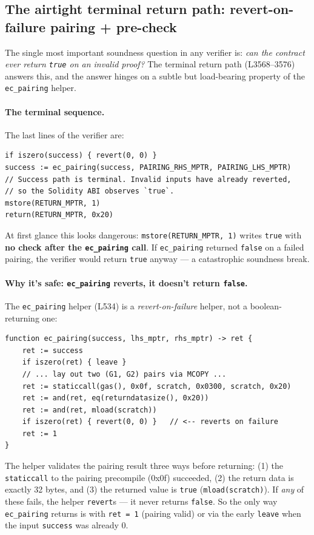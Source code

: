 \subsection{The airtight terminal return path: revert-on-failure pairing + pre-check}
\label{sec:pr-returnpath}

The single most important soundness question in any verifier is:
\emph{can the contract ever return \texttt{true} on an invalid
proof?} The terminal return path (L3568--3576) answers this, and
the answer hinges on a subtle but load-bearing property of the
\texttt{ec\_pairing} helper.

\paragraph{The terminal sequence.} The last lines of the verifier
are:
\begin{lstlisting}[style=yul]
if iszero(success) { revert(0, 0) }
success := ec_pairing(success, PAIRING_RHS_MPTR, PAIRING_LHS_MPTR)
// Success path is terminal. Invalid inputs have already reverted,
// so the Solidity ABI observes `true`.
mstore(RETURN_MPTR, 1)
return(RETURN_MPTR, 0x20)
\end{lstlisting}
At first glance this looks dangerous: \texttt{mstore(RETURN\_\allowbreak{}MPTR,
1)} writes \texttt{true} with \textbf{no check after the
\texttt{ec\_pairing} call}. If \texttt{ec\_pairing} returned
\texttt{false} on a failed pairing, the verifier would return
\texttt{true} anyway --- a catastrophic soundness break.

\paragraph{Why it's safe: \texttt{ec\_pairing} reverts, it doesn't
return \texttt{false}.} The \texttt{ec\_pairing} helper (L534) is
a \emph{revert-on-failure} helper, not a boolean-returning one:
\begin{lstlisting}[style=yul]
function ec_pairing(success, lhs_mptr, rhs_mptr) -> ret {
    ret := success
    if iszero(ret) { leave }
    // ... lay out two (G1, G2) pairs via MCOPY ...
    ret := staticcall(gas(), 0x0f, scratch, 0x0300, scratch, 0x20)
    ret := and(ret, eq(returndatasize(), 0x20))
    ret := and(ret, mload(scratch))
    if iszero(ret) { revert(0, 0) }   // <-- reverts on failure
    ret := 1
}
\end{lstlisting}
The helper validates the pairing result three ways before
returning: (1) the \texttt{staticcall} to the pairing precompile
(0x0f) succeeded, (2) the return data is exactly 32 bytes, and
(3) the returned value is \texttt{true} (\texttt{mload(scratch)}).
If \emph{any} of these fails, the helper \texttt{revert}s --- it
never returns \texttt{false}. So the only way \texttt{ec\_pairing}
returns is with \texttt{ret = 1} (pairing valid) or via the early
\texttt{leave} when the input \texttt{success} was already 0.

